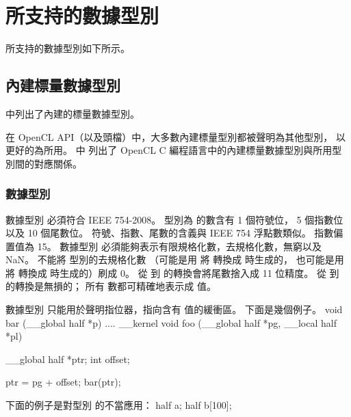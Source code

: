 \section{所支持的數據型別}

所支持的數據型別如下所示。

\subsection[sec:bisdt]{內建標量數據型別}

中列出了內建的標量數據型別。

{}

在 OpenCL API（以及頭檔）中，大多數內建標量型別都被聲明為其他型別，
以更好的為所用。
中
列出了 OpenCL C 編程語言中的內建標量數據型別與所用型別間的對應關係。

{}

\subsubsection[sec:dataTypeHalf]{數據型別 }

數據型別  必須符合 IEEE 754-2008。
型別為  的數含有 1 個符號位， 5 個指數位以及 10 個尾數位。
符號、指數、尾數的含義與 IEEE 754 浮點數類似。
指數偏置值為 15。
數據型別  必須能夠表示有限規格化數，去規格化數，無窮以及 NaN。
不能將  型別的去規格化數
（可能是用  將  轉換成  時生成的，
也可能是用  將  轉換成  時生成的）刷成 0。
從  到  的轉換會將尾數捨入成 11 位精度。
從   到  的轉換是無損的；
所有  數都可精確地表示成  值。

數據型別  只能用於聲明指位器，指向含有  值的緩衝區。
下面是幾個例子。
\startclc
void bar (__global half *p)
{
	....
}
__kernel void foo (__global half *pg, __local half *pl)
{
	__global half *ptr;
	int offset;

	ptr = pg + offset;
	bar(ptr);
}
\stopclc

下面的例子是對型別  的不當應用：
\startclc
half a;
half b[100];

